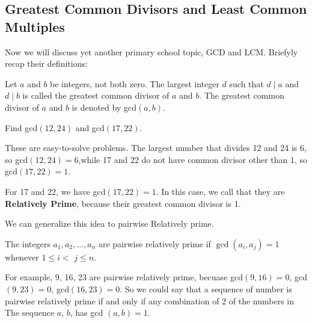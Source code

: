     \subsection{Greatest Common Divisors and Least Common Multiples}
        Now we will discuss yet another primary school topic, GCD and LCM. Briefyly recap their definitions:
        \begin{definition}
            Let $a$ and $b$ be integers, not both zero. The largest integer $d$ such that $d \mid a$ and 
            $d \mid b $ is called the greatest common divisor of $a$ and $b$. The greatest common divisor of 
            $a$ and $b$ is denoted by gcd$(a, b)$.
        \end{definition}

    \begin{example}
        Find gcd$(12, 24)$ and gcd$(17, 22)$.

        These are easy-to-solve problems. The largest number that divides 12 and 24 is 6, so gcd$(12,24)=6$,while 
        17 and 22 do not have common divisor other than 1, so gcd$(17, 22)=1$.
    \end{example}

    For 17 and 22, we have gcd$(17, 22)=1$. In this case, we call that they are \textbf{Relatively Prime}, because
    their greatest common divisor is 1.

    We can generalize this idea to pairwise Relatively prime.
    \begin{definition}
        The integers $a_1,a_2,...,a_n$ are pairwise relatively prime if $\gcd(a_i,a_j)=1$ whenever $1\leq i<$ $j\leq n.$
    \end{definition}
    For example, 9, 16, 23 are pairwise relatively prime, becuase gcd$(9,16)=0$, gcd$(9,23)=0$, gcd$(16,23)=0$. So we could
    say that a sequence of number is pairwise relatively prime if and only if any combination of 2 of the numbers in The
    sequence $a$, $b$, has gcd $(a,b)=1$.

